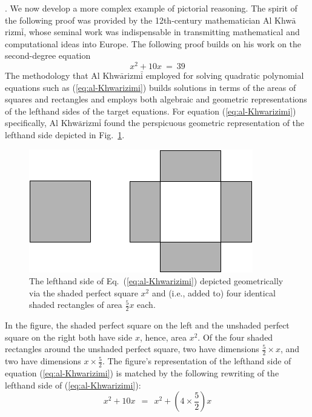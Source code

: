 .
We now develop a more complex example of pictorial reasoning.  The spirit of the following proof was provided by the 12th-century mathematician Al Khw$\bar{\mbox{a}}$rizm$\bar{\mbox{i}}$, whose seminal work \cite{Al-Khwarizmi} was indispensable in transmitting mathematical and computational ideas into Europe.  The following proof builds on his work on the second-degree equation
\begin{equation}
\label{eq:al-Khwarizimi}
x^2 + 10 x \ = \ 39
\end{equation}
The methodology that Al Khw$\bar{\mbox{a}}$rizm$\bar{\mbox{i}}$ employed for solving quadratic polynomial equations such as (\ref{eq:al-Khwarizimi}) builds solutions in terms of the areas of squares and rectangles and employs both algebraic and geometric representations of the lefthand sides of the target equations.  For equation (\ref{eq:al-Khwarizimi}) specifically, Al Khw$\bar{\mbox{a}}$rizm$\bar{\mbox{i}}$ found the perspicuous geometric representation of the lefthand side depicted in Fig.~\ref{fig:EqElKwarismi1}.
\begin{figure}[ht]
\begin{center}
       \includegraphics[scale=0.4]{FiguresArithmetic/EquationElKwarismi1}
\caption{The lefthand side of Eq.~(\ref{eq:al-Khwarizimi}) depicted geometrically via the shaded perfect square $x^2$ and (i.e., added to) four identical shaded rectangles of area $\frac{5}{2} x$ each.}
       \label{fig:EqElKwarismi1}
\end{center}
\end{figure}
In the figure, the shaded perfect square on the left and the unshaded perfect square on the right both have side $x$, hence, area $x^2$.  Of the four shaded rectangles around the unshaded perfect square, two have dimensions $\frac{5}{2} \times x$, and two have dimensions $x \times \frac{5}{2}$.  The figure's representation of the lefthand side of equation (\ref{eq:al-Khwarizimi}) is matched by the following rewriting of the lefthand side of (\ref{eq:al-Khwarizimi}):
\[ x^2 + 10 x \ \ = \ \ x^2 + \left( 4 \times \frac{5}{2} \right) x \]

